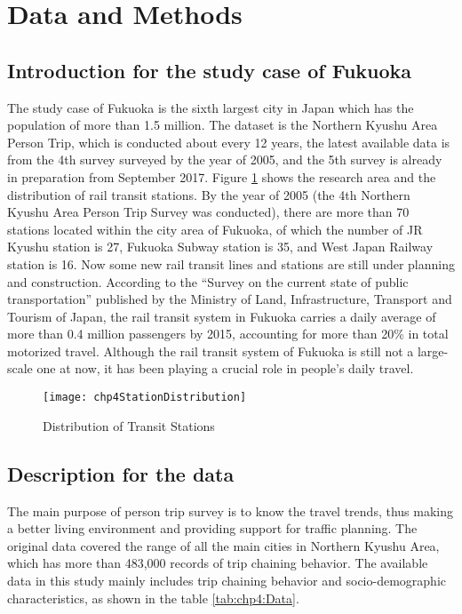 %
\section{Data and Methods}
%
\subsection{Introduction for the study case of Fukuoka}
The study case of Fukuoka is the sixth largest city in Japan which has the population of more than 1.5 million. The dataset is the Northern Kyushu Area Person Trip, which is conducted about every 12 years, the latest available data is from the 4th survey surveyed by the year of 2005, and the 5th survey is already in preparation from September 2017. Figure \ref{fig:chp4:StationDistribution} shows the research area and the distribution of rail transit stations. By the year of 2005 (the 4th Northern Kyushu Area Person Trip Survey was conducted), there are more than 70 stations located within the city area of Fukuoka, of which the number of JR Kyushu station is 27, Fukuoka Subway station is 35, and West Japan Railway station is 16. Now some new rail transit lines and stations are still under planning and construction. According to the “Survey on the current state of public transportation” published by the Ministry of Land, Infrastructure, Transport and Tourism of Japan, the rail transit system in Fukuoka carries a daily average of more than 0.4 million passengers by 2015, accounting for more than 20\% in total motorized travel. Although the rail transit system of Fukuoka is still not a large-scale one at now, it has been playing a crucial role in people's daily travel.

\begin{figure}[htbp]
	\centering
	\texttt{[image: chp4StationDistribution]}
	\caption{Distribution of Transit Stations}
	\label{fig:chp4:StationDistribution}
\end{figure}

%
\subsection{Description for the data}
The main purpose of person trip survey is to know the travel trends, thus making a better living environment and providing support for traffic planning. The original data covered the range of all the main cities in Northern Kyushu Area, which has more than 483,000 records of trip chaining behavior. The available data in this study mainly includes trip chaining behavior and socio-demographic characteristics, as shown in the table \ref{tab:chp4:Data}.

